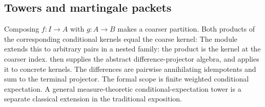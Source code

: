 \subsection{Towers and martingale packets}
Composing $f:I\to A$ with $g:A\to B$ makes a coarser partition. Both products of the corresponding conditional kernels equal the coarse kernel:
The module extends this to arbitrary pairs in a nested family: the product is the kernel at the coarser index.  then supplies the abstract difference-projector algebra, and  applies it to concrete kernels. The differences are pairwise annihilating idempotents and sum to the terminal projector. The formal scope is finite weighted conditional expectation. A general measure-theoretic conditional-expectation tower is a separate classical extension in the traditional exposition.
